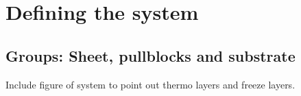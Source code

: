 



\section{Defining the system}

\subsection{Groups: Sheet, pullblocks and substrate}
Include figure of system to point out thermo layers and freeze layers.


